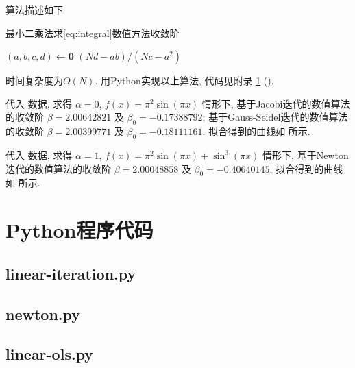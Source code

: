 \documentclass{nedsart}
\begin{document}
算法描述如下\\
\begin{algorithm}[H]
    \caption{最小二乘法求\eqref{eq:integral}数值方法收敛阶}
    
    $(a, b, c, d) \leftarrow \bm{0}$\;
    \KwRet $(Nd - ab) / (Nc - a^2)$\;
\end{algorithm}\noindent
时间复杂度为$O(N)$. 用Python实现以上算法, 代码见附录 \ref{sec:python} (). 

代入 数据, 求得 $\alpha = 0$, $f(x) = \pi^2 \sin(\pi x)$ 情形下, 基于Jacobi迭代的数值算法的收敛阶 $\beta = 2.00642821$ 及 $\beta_0 = -0.17388792$; 基于Gauss-Seidel迭代的数值算法的收敛阶 $\beta = 2.00399771$ 及 $\beta_0 = -0.18111161$. 拟合得到的曲线如 所示. 

代入 数据, 求得 $\alpha = 1$, $f(x) = \pi^2 \sin(\pi x) + \sin^3(\pi x)$ 情形下, 基于Newton迭代的数值算法的收敛阶 $\beta = 2.00048858$ 及 $\beta_0 = -0.40640145$. 拟合得到的曲线如 所示. 

\setupappendix

\clearpage
\section{Python程序代码}\label{sec:python}

\subsection{linear-iteration.py}\label{py:linear-itr}

\subsection{newton.py}\label{py:newton}

\subsection{linear-ols.py}\label{py:linear-ols}
\end{document}
